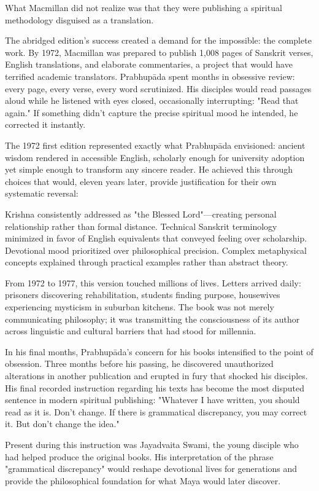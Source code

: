\documentclass[12pt,twoside]{book}
\begin{document}
What Macmillan did not realize was that they were publishing a spiritual methodology disguised as a translation.

The abridged edition's success created a demand for the impossible: the complete work. By 1972, Macmillan was prepared to publish 1,008 pages of Sanskrit verses, English translations, and elaborate commentaries, a project that would have terrified academic translators. Prabhupāda spent months in obsessive review: every page, every verse, every word scrutinized. His disciples would read passages aloud while he listened with eyes closed, occasionally interrupting: "Read that again." If something didn't capture the precise spiritual mood he intended, he corrected it instantly.

The 1972 first edition represented exactly what Prabhupāda envisioned: ancient wisdom rendered in accessible English, scholarly enough for university adoption yet simple enough to transform any sincere reader. He achieved this through choices that would, eleven years later, provide justification for their own systematic reversal:

Krishna consistently addressed as "the Blessed Lord"—creating personal relationship rather than formal distance. Technical Sanskrit terminology minimized in favor of English equivalents that conveyed feeling over scholarship. Devotional mood prioritized over philosophical precision. Complex metaphysical concepts explained through practical examples rather than abstract theory.

From 1972 to 1977, this version touched millions of lives. Letters arrived daily: prisoners discovering rehabilitation, students finding purpose, housewives experiencing mysticism in suburban kitchens. The book was not merely communicating philosophy; it was transmitting the consciousness of its author across linguistic and cultural barriers that had stood for millennia.

In his final months, Prabhupāda's concern for his books intensified to the point of obsession. Three months before his passing, he discovered unauthorized alterations in another publication and erupted in fury that shocked his disciples. His final recorded instruction regarding his texts has become the most disputed sentence in modern spiritual publishing: "Whatever I have written, you should read as it is. Don't change. If there is grammatical discrepancy, you may correct it. But don't change the idea."

Present during this instruction was Jayadvaita Swami, the young disciple who had helped produce the original books. His interpretation of the phrase "grammatical discrepancy" would reshape devotional lives for generations and provide the philosophical foundation for what Maya would later discover.
\end{document}
